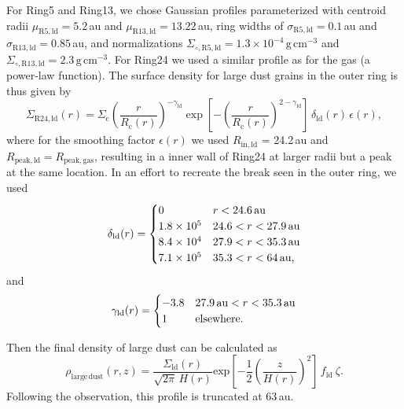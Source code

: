 \documentclass[fleqn,usenatbib,useAMS]{mnras}
\begin{document}
For Ring5 and Ring13, we chose Gaussian profiles parameterized with centroid radii $\mu_{\mathrm{R5, ld}}=5.2$\,au and $\mu_{\mathrm{R13, ld}}=13.22$\,au, ring widths of $\sigma_{\mathrm{R5,ld}}=0.1$\,au and $\sigma_{\mathrm{R13,ld}}=0.85$\,au, and normalizations $\Sigma_{\circ,\mathrm{R5,ld}}=1.3\times10^{-4}\,\mathrm{g\,cm^{-3}}$ and $\Sigma_{\circ,\mathrm{R13,ld}}=2.3\,\mathrm{g\,cm^{-3}}$. For Ring24 we used a similar profile as for the gas (a power-law function). The surface density for large dust grains in the outer ring is thus given by
\begin{equation}
    \Sigma_{\mathrm{R24,ld}}(r) = \Sigma_{\mathrm{c}} \left(\frac{r}{R_{\mathrm{c}}(r)}\right)^{-\gamma_{\mathrm{ld}}} \exp\left[-\left(\frac{r}{R_{\mathrm{c}}(r)}\right)^{2-\gamma_{\mathrm{ld}}}\right]\,\delta_{\mathrm{ld}}(r) \,\epsilon(r),
\end{equation}
where for the smoothing factor $\epsilon(r)$ we used $R_\mathrm{in,ld}$ = 24.2\,au and $R_\mathrm{peak,ld} = R_\mathrm{peak,gas}$, resulting in a inner wall of Ring24 at larger radii but a peak at the same location. In an effort to recreate the break seen in the outer ring, we used
\begin{equation}
  \delta_{\mathrm{ld}}(r) =
  \begin{cases}
  0                 & r < 24.6\text{\,au} \\
  1.8 \times10^{5} & 24.6 < r < 27.9\text{\,au} \\
  8.4 \times10^{4} & 27.9 < r < 35.3\text{\,au} \\
  7.1 \times10^{5} & 35.3 < r < 64\text{\,au,} \\
  \end{cases}
\end{equation}
and
\begin{equation}
  \gamma_{\mathrm{ld}}(r) =
  \begin{cases}
  -3.8 & 27.9\text{\,au} < r < 35.3\text{\,au} \\
    1                 &  {\rm elsewhere.} \\
  \end{cases}
\end{equation}

Then the final density of large dust can be calculated as
\begin{equation}
\rho_{\mathrm{large\,dust}}(r,z)=
\frac{\Sigma_{\mathrm{ld}}(r)}{\sqrt{2\pi} \, H(r)} \mathrm{exp}\left[-\frac{1}{2} \left(\frac{z}{H(r)}\right)^2\right] \, f_{\mathrm{ld}} \: \zeta.
\end{equation}
Following the observation, this profile is truncated at 63\,au.
\end{document}

